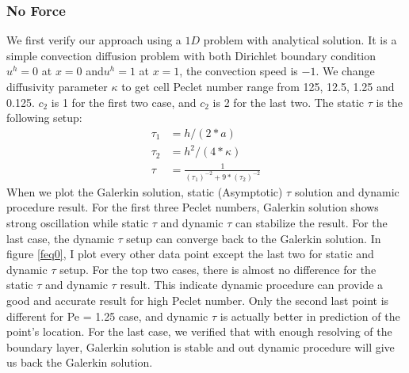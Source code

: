 \documentclass[10pt]{article}
\begin{document}
\subsubsection{No Force}
We first verify our approach using a $1D$ problem with analytical solution. It is a simple convection diffusion problem with both Dirichlet boundary condition $u^{h} = 0$ at $x=0$ and$u^{h} = 1$ at $x=1$, the convection speed is $-1$. We change diffusivity parameter $\kappa$ to get cell Peclet number range from 125, 12.5, 1.25 and 0.125. $c_2$ is 1 for the first two case, and $c_2$ is 2 for the last two.
The static $\tau$ is the following setup:
\begin{equation}
    \begin{aligned}
       \tau_1  &= h/(2*a) \\
       \tau_2  &= h^2/(4*\kappa) \\
       \tau &=\frac{1}{(\tau_1)^{-2}+9*(\tau_2)^{-2}}
    \end{aligned}\label{eq:2} 
\end{equation}
When we plot the Galerkin solution, static (Asymptotic) $\tau$ solution and dynamic procedure result. For the first three Peclet numbers, Galerkin solution shows strong oscillation while static $\tau$ and dynamic $\tau$ can stabilize the result. For the last case, the dynamic $\tau$ setup can converge back to the Galerkin solution. In figure \ref{feq0}, I plot every other data point except the last two for static and dynamic $\tau$ setup.  For the top two cases, there is almost no difference for the static $\tau$ and dynamic $\tau$ result. This indicate dynamic procedure can provide a good and accurate result for high Peclet number. Only the second last point is different for Pe = 1.25 case, and dynamic $\tau$ is actually better in prediction of the point's location. For the last case, we verified that with enough resolving of the boundary layer, Galerkin solution is stable and out dynamic procedure will give us back the Galerkin solution.
\end{document}
